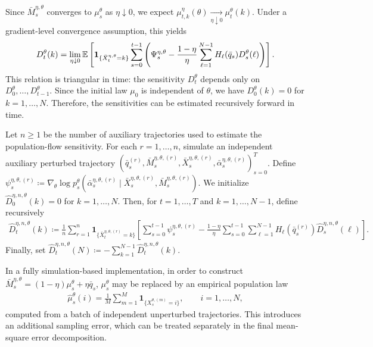Since $\bar M_s^{\eta, \theta}$ converges to $\mu_s^\theta$ as $\eta\downarrow0$, we expect $\mu_{t,k}^\eta(\theta) \xrightarrow[\eta\downarrow0]{} \mu_t^\theta(k)$. Under a gradient-level convergence assumption, this yields
\begin{align}
    D_t^\theta(k) = \lim_{\eta\downarrow0}\mathbb{E}\left[ \mathbf{1}_{\{\bar X_t^{\eta,\theta}=k\}} \sum_{s=0}^{t-1} \left(\Psi_s^{\eta, \theta} - \frac{1-\eta}{\eta}\sum_{\ell=1}^{N-1}H_\ell(\bar q_s)D_s^\theta(\ell) \right) \right].
\end{align}
This relation is triangular in time: the sensitivity $D_t^\theta$ depends only on $D_0^\theta, \ldots, D_{t-1}^\theta$. Since the initial law $\mu_0$ is independent of $\theta$, we have $D_0^\theta(k) = 0$ for $k=1,\ldots,N$. Therefore, the sensitivities can be estimated recursively forward in time.

Let $n\geq 1$ be the number of auxiliary trajectories used to estimate the population-flow sensitivity. For each $r=1,\ldots,n$, simulate an independent auxiliary perturbed trajectory $\left(\bar q_s^{(r)}, \bar M_s^{\eta,\theta,(r)}, \bar X_s^{\eta,\theta,(r)}, \bar \alpha_s^{\eta,\theta,(r)} \right)_{s=0}^T$. Define $\psi_s^{\eta,\theta,(r)} \coloneqq \nabla_\theta \log p_s^\theta(\bar \alpha_s^{\eta,\theta,(r)}\mid \bar X_s^{\eta,\theta,(r)}, \bar M_s^{\eta,\theta,(r)})$. We initialize $\widehat D_0^{\eta,n,\theta}(k)=0$ for $k=1,\ldots,N$. Then, for $t=1,\ldots,T$ and $k=1,\ldots,N-1$, define recursively
\begin{align}
    \widehat D_t^{\eta,n,\theta} (k) \coloneqq \frac{1}{n} \sum_{r=1}^n \mathbf 1_{\{\bar X_t^{\eta,\theta,(r)}=k\}} \left[\sum_{s=0}^{t-1}\psi_s^{\eta,\theta,(r)} - \frac{1-\eta}{\eta}\sum_{s=0}^{t-1} \sum_{\ell=1}^{N-1} H_\ell(\bar q_s^{(r)}) \widehat D_s^{\eta,n,\theta}(\ell) \right].
\end{align}
Finally, set $\widehat D_t^{\eta,n,\theta}(N) \coloneqq - \sum_{k=1}^{N-1} \widehat D_t^{\eta,n,\theta}(k)$.

\begin{remark}
    In a fully simulation-based implementation, in order to construct $\bar M_s^{\eta,\theta} = (1-\eta)\mu_s^\theta + \eta\bar q_s$, $\mu_s^\theta$ may be replaced by an empirical population law
    \begin{align}
        \widehat \mu_s^\theta(i) = \frac{1}{M} \sum_{m=1}^M \mathbf 1_{\{X_s^{\theta,(m)} = i\}},\qquad i=1,\ldots,N,
    \end{align}
    computed from a batch of independent unperturbed trajectories. This introduces an additional sampling error, which can be treated separately in the final mean-square error decomposition.
\end{remark}

